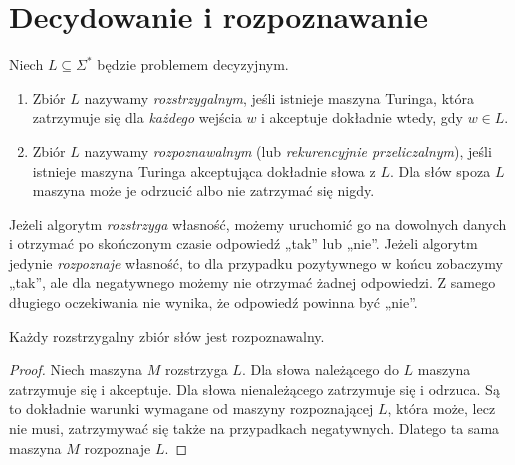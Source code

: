 \section{Decydowanie i rozpoznawanie}
\begin{definicja}\label{def:computability-decidable-c.e.}
Niech $L\subseteq\Sigma^*$ będzie problemem decyzyjnym.
\begin{enumerate}[label=(\roman*)]
\item Zbiór $L$ nazywamy \emph{rozstrzygalnym}, jeśli istnieje
maszyna Turinga, która zatrzymuje się dla \emph{każdego} wejścia $w$
i akceptuje dokładnie wtedy, gdy $w\in L$.
\item Zbiór $L$ nazywamy \emph{rozpoznawalnym}
(lub \emph{rekurencyjnie przeliczalnym}), jeśli istnieje
maszyna Turinga akceptująca dokładnie słowa z $L$.
Dla słów spoza $L$ maszyna może je odrzucić albo
nie zatrzymać się nigdy.
\end{enumerate}
\end{definicja}

\begin{przyklad}
Jeżeli algorytm \emph{rozstrzyga} własność,
możemy uruchomić go na dowolnych danych i otrzymać
po skończonym czasie odpowiedź „tak” lub „nie”.
Jeżeli algorytm jedynie \emph{rozpoznaje} własność,
to dla przypadku pozytywnego w końcu zobaczymy „tak”,
ale dla negatywnego możemy nie otrzymać żadnej odpowiedzi.
Z samego długiego oczekiwania nie wynika,
że odpowiedź powinna być „nie”.
\end{przyklad}

\begin{lemat}\label{lem:computability-decidable-recognizable}
Każdy rozstrzygalny zbiór słów jest rozpoznawalny.
\end{lemat}
\begin{proof}
Niech maszyna $M$ rozstrzyga $L$.
Dla słowa należącego do $L$ maszyna zatrzymuje się
i akceptuje. Dla słowa nienależącego zatrzymuje się
i odrzuca. Są to dokładnie warunki wymagane
od maszyny rozpoznającej $L$, która może, lecz nie musi,
zatrzymywać się także na przypadkach negatywnych.
Dlatego ta sama maszyna $M$ rozpoznaje $L$.
\end{proof}

